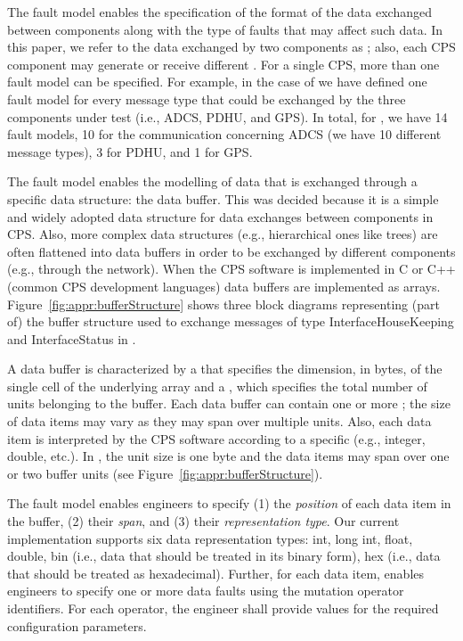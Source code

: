 The \APPR fault model enables the specification of the format of the data exchanged between components along with the type of faults that may affect such data. 
In this paper, we refer to the data exchanged by two components as ; also, each CPS component may generate or receive different .
For a single CPS, more than one fault model can be specified. For example, in the case of \ESAIL{} we have defined one fault model for every message type that could be exchanged by the three components under test (i.e., ADCS, PDHU, and GPS). In total, for \ESAIL, we have 14 fault models, 10 for the communication concerning ADCS (we have 10 different message types), 3 for PDHU, and 1 for GPS.

The \APPR fault model enables the modelling of data that is exchanged through a specific data structure: the data buffer. This was decided because it is a simple and widely adopted data structure for data exchanges between components in CPS. Also, more complex data structures (e.g., hierarchical ones like trees) are often flattened into data buffers in order to be exchanged by different components (e.g., through the network). When the CPS software is implemented in C or C++ (common CPS development languages) data buffers are implemented as arrays. Figure~\ref{fig:appr:bufferStructure} shows three block diagrams representing (part of) the buffer structure used to exchange messages of type InterfaceHouseKeeping and InterfaceStatus in \ESAIL.

A data buffer is characterized by a  that specifies the dimension, in bytes, of the single cell of the underlying array and a , which specifies the total number of units belonging to the buffer. Each data buffer can contain one or more ; the size of data items may vary as they may span over multiple units. Also, each data item is interpreted by the CPS software according to a specific  (e.g., integer, double, etc.). 
In \ESAIL, the unit size is one byte and the data items may span over one or two buffer units (see Figure~\ref{fig:appr:bufferStructure}). 

The \APPR fault model enables engineers to specify (1) the \emph{position} of each data item in the buffer, (2) their \emph{span}, and (3) their \emph{representation type}. Our current implementation supports six data representation types: int, long int, float, double, bin (i.e., data that should be treated in its binary form), hex (i.e., data that should be treated as hexadecimal).
Further, for each data item, \APPR enables engineers to specify one or more data faults using the mutation operator identifiers. For each operator, the engineer 
shall provide values for the required configuration parameters.

